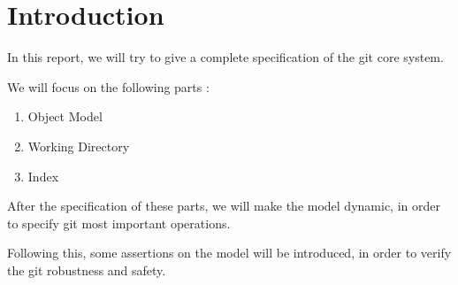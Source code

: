 \section{Introduction}

In this report, we will try to give a complete specification
of the git core system. \par
We will focus on the following parts :

\begin{enumerate}
\item Object Model
\item Working Directory
\item Index
\end{enumerate}

After the specification of these parts, we will make the
model dynamic, in order to specify git most important operations.

Following this, some assertions on the model will be
introduced, in order
to verify the git robustness and safety. \par 
